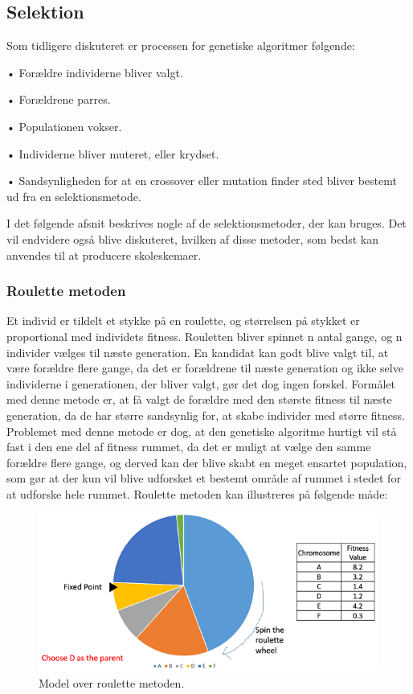 \subsection{Selektion}
Som tidligere diskuteret er processen for genetiske algoritmer følgende:

•	Forældre individerne bliver valgt.


•	Forældrene parres.


•	Populationen vokser.


•	Individerne bliver muteret, eller krydset.


•	Sandsynligheden for at en crossover eller mutation finder sted bliver bestemt ud fra en selektionsmetode.


I det følgende afsnit beskrives nogle af de selektionsmetoder, der kan bruges. Det vil endvidere også blive diskuteret, hvilken af disse metoder, som bedst kan anvendes til at producere skoleskemaer.

\subsubsection{Roulette metoden}
Et individ er tildelt et stykke på en roulette, og størrelsen på stykket er proportional med individets fitness. Rouletten bliver spinnet n antal gange, og n individer vælges til næste generation. En kandidat kan godt blive valgt til, at være forældre flere gange, da det er forældrene til næste generation og ikke selve individerne i generationen, der bliver valgt, gør det dog ingen forskel. Formålet med denne metode er, at få valgt de forældre med den største fitness til næste generation, da de har større sandsynlig for, at skabe individer med større fitness. Problemet med denne metode er dog, at den genetiske algoritme hurtigt vil stå fast i den ene del af fitness rummet, da det er muligt at vælge den samme forældre flere gange, og derved kan der blive skabt en meget ensartet population, som gør at der kun vil blive udforsket et bestemt område af rummet i stedet for at udforske hele rummet.
Roulette metoden kan illustreres på følgende måde:
\begin{figure}[!h]
  \centering
  \includegraphics[width=\textwidth]{partials/graphics/roulette.png}
  \caption{Model over roulette metoden.}
  \label{fig:roulette}
\end{figure}


